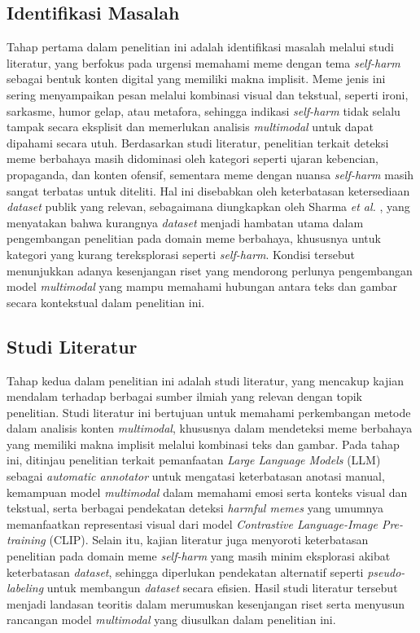 \subsection{Identifikasi Masalah} \label{subsec:identifikasi_masalah}
Tahap pertama dalam penelitian ini adalah identifikasi masalah  melalui studi literatur, yang berfokus pada urgensi memahami meme dengan tema \textit{self-harm} sebagai bentuk konten digital yang memiliki makna implisit. Meme jenis ini sering menyampaikan pesan melalui kombinasi visual dan tekstual, seperti ironi, sarkasme, humor gelap, atau metafora, sehingga indikasi \textit{self-harm} tidak selalu tampak secara eksplisit dan memerlukan analisis \textit{multimodal} untuk dapat dipahami secara utuh. Berdasarkan studi literatur, penelitian terkait deteksi meme berbahaya masih didominasi oleh kategori seperti ujaran kebencian, propaganda, dan konten ofensif, sementara meme dengan nuansa \textit{self-harm} masih sangat terbatas untuk diteliti. Hal ini disebabkan oleh keterbatasan ketersediaan \textit{dataset} publik yang relevan, sebagaimana diungkapkan oleh Sharma \textit{et al.} \cite{Sharma2022HarmfulMemes}, yang menyatakan bahwa kurangnya \textit{dataset} menjadi hambatan utama dalam pengembangan penelitian pada domain meme berbahaya, khususnya untuk kategori yang kurang tereksplorasi seperti \textit{self-harm}. Kondisi tersebut menunjukkan adanya kesenjangan riset yang mendorong perlunya pengembangan model \textit{multimodal} yang mampu memahami hubungan antara teks dan gambar secara kontekstual dalam penelitian ini.

\subsection{Studi Literatur} \label{subsec:studi_literatur}
Tahap kedua dalam penelitian ini adalah studi literatur, yang mencakup kajian mendalam terhadap berbagai sumber ilmiah yang relevan dengan topik penelitian. Studi literatur ini bertujuan untuk memahami perkembangan metode dalam analisis konten \textit{multimodal}, khususnya dalam mendeteksi meme berbahaya yang memiliki makna implisit melalui kombinasi teks dan gambar. Pada tahap ini, ditinjau penelitian terkait pemanfaatan \textit{Large Language Models} (LLM) sebagai \textit{automatic annotator} untuk mengatasi keterbatasan anotasi manual, kemampuan model \textit{multimodal} dalam memahami emosi serta konteks visual dan tekstual, serta berbagai pendekatan deteksi \textit{harmful memes} yang umumnya memanfaatkan representasi visual dari model \textit{Contrastive Language-Image Pre-training} (CLIP). Selain itu, kajian literatur juga menyoroti keterbatasan penelitian pada domain meme \textit{self-harm} yang masih minim eksplorasi akibat keterbatasan \textit{dataset}, sehingga diperlukan pendekatan alternatif seperti \textit{pseudo-labeling} untuk membangun \textit{dataset} secara efisien. Hasil studi literatur tersebut menjadi landasan teoritis dalam merumuskan kesenjangan riset serta menyusun rancangan model \textit{multimodal} yang diusulkan dalam penelitian ini.

